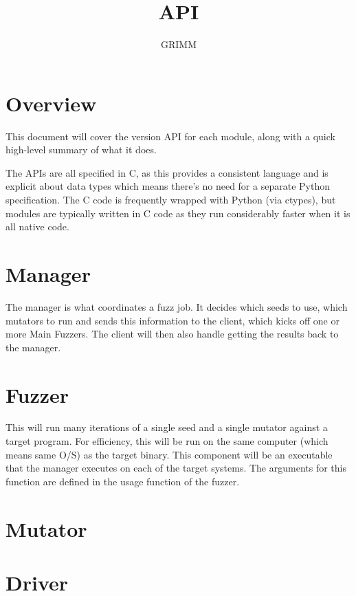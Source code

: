 \documentclass{article}
\title{\killerbeez{} API}
\author{GRIMM}
\date{\apiDate{}}
\begin{document}
\thispagestyle{empty}
\maketitle
\newpage

\tableofcontents
\newpage

\section{Overview}
This document will cover the version \apiVersion{} API for each module, along
with a quick high-level summary of what it does.

\par
The APIs are all specified in C, as this provides a consistent language and is
explicit about data types which means there's no need for a separate Python
specification.  The C code is frequently wrapped with Python (via ctypes), but
modules are typically written in C code as they run considerably faster when
it is all native code.

\section{Manager}
The manager is what coordinates a fuzz job.  It decides which seeds to use,
which mutators to run and sends this information to the client, which kicks
off one or more Main Fuzzers.  The client will then also handle getting the
results back to the manager.

\section{Fuzzer}
This will run many iterations of a single seed and a single mutator against a
target program.  For efficiency, this will be run on the same computer (which
means same O/S) as the target binary.  This component will be an executable that
the manager executes on each of the target systems.  The arguments for this
function are defined in the usage function of the fuzzer.

\section{Mutator}
\label{mutator}


\section{Driver}
\label{driver}

\end{document}
